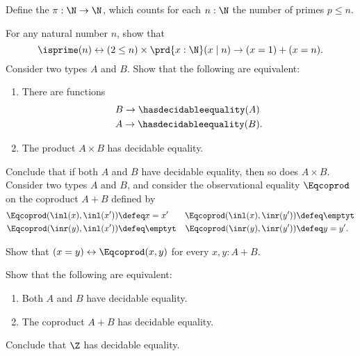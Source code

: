 \begin{exercises}
\begin{subexenum}
  \item Define the  $\pi:\N\to\N$, which counts for each $n:\N$ the number of primes $p\leq n$.
  \end{subexenum}
  \exitem For any natural number $n$, show that
  \begin{equation*}
    \isprime(n)\leftrightarrow (2\leq n)\times \prd{x:\N} (x\mid n)\to (x=1)+(x=n).
  \end{equation*}
  \exitem Consider two types $A$ and $B$. Show that the following are equivalent:
  \begin{enumerate}
  \item There are functions
    \begin{align*}
      & B \to \hasdecidableequality(A) \\
      & A \to \hasdecidableequality(B).
    \end{align*}
  \item The product $A\times B$ has decidable equality.
  \end{enumerate}
  Conclude that if both $A$ and $B$ have decidable equality, then so does $A\times B$.
  \exitem Consider two types $A$ and $B$, and consider the observational equality $\Eqcoprod$ on the coproduct $A+B$ defined by
  \begin{align*}
    \Eqcoprod(\inl(x),\inl(x')) & \defeq x= x' & \Eqcoprod(\inl(x),\inr(y')) & \defeq \emptyt \\
    \Eqcoprod(\inr(y),\inl(x')) & \defeq \emptyt & \Eqcoprod(\inr(y),\inr(y')) & \defeq y = y'.
  \end{align*}
  \begin{subexenum}
  \item Show that $(x=y)\leftrightarrow\Eqcoprod(x,y)$ for every $x,y:A+B$.
  \item Show that the following are equivalent:
    \begin{enumerate}
    \item Both $A$ and $B$ have decidable equality.
    \item The coproduct $A+B$ has decidable equality.
    \end{enumerate}
    Conclude that $\Z$ has decidable equality.
  \end{subexenum}

\end{exercises}

